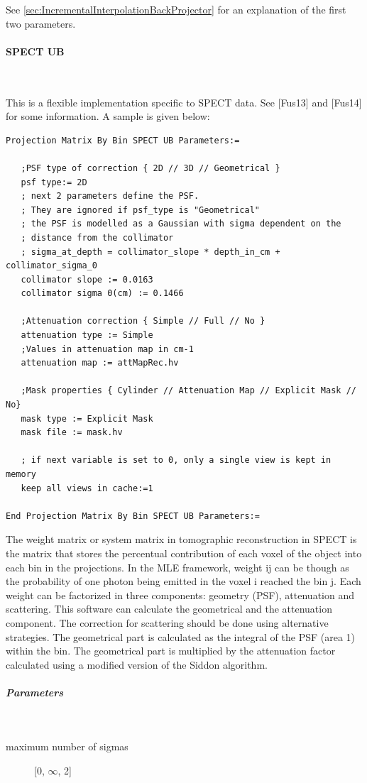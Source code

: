\documentclass{article}
\newcommand{\subsubsubsection}[1]{\paragraph{#1}\mbox{} \\}
\newcommand{\subsubsubsubsection}[1]{\subparagraph{#1} \mbox{} \\}
\begin{document}
{{See \ref{sec:IncrementalInterpolationBackProjector} for an explanation 
of the first two parameters.

{ \subsubsubsection{SPECT UB} }
\label{sec:projmatrixSPECTUB}
This is a flexible implementation specific to SPECT data. See [Fus13] and [Fus14] for some information.
A sample is given below:

\begin{verbatim}
Projection Matrix By Bin SPECT UB Parameters:=

   ;PSF type of correction { 2D // 3D // Geometrical }
   psf type:= 2D
   ; next 2 parameters define the PSF. 
   ; They are ignored if psf_type is "Geometrical"
   ; the PSF is modelled as a Gaussian with sigma dependent on the 
   ; distance from the collimator
   ; sigma_at_depth = collimator_slope * depth_in_cm + collimator_sigma_0
   collimator slope := 0.0163
   collimator sigma 0(cm) := 0.1466

   ;Attenuation correction { Simple // Full // No }
   attenuation type := Simple
   ;Values in attenuation map in cm-1
   attenuation map := attMapRec.hv

   ;Mask properties { Cylinder // Attenuation Map // Explicit Mask // No}
   mask type := Explicit Mask
   mask file := mask.hv

   ; if next variable is set to 0, only a single view is kept in memory
   keep all views in cache:=1

End Projection Matrix By Bin SPECT UB Parameters:=
\end{verbatim}

The weight matrix or system matrix in tomographic reconstruction in SPECT is the matrix that stores the
percentual contribution of each voxel of the object into each bin in the projections. In the MLE
framework, weight ij can be though as the probability of one photon being emitted in the voxel i reached
the bin j. Each weight can be factorized in three components: geometry (PSF), attenuation and scattering.
This software can calculate the geometrical and the attenuation component. The correction for scattering
should be done using alternative strategies. The geometrical part is calculated as the integral of the
PSF (area 1) within the bin. The geometrical part is multiplied by the attenuation factor calculated
using a modified version of the Siddon algorithm.  

{ \subsubsubsubsection{Parameters} }
\begin{description}

\item[maximum number of sigmas] [0, $\infty$, 2{]}


\end{description}}}
\end{document}
